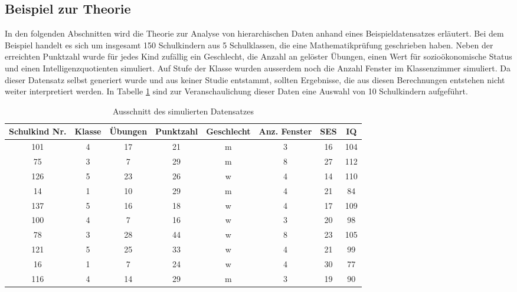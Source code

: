 \documentclass[12pt]{article}\usepackage[]{graphicx}\usepackage[]{color}
\begin{document}
\subsection{Beispiel zur Theorie} \label{section:bsp_theorie}
In den folgenden Abschnitten wird die Theorie zur Analyse von hierarchischen Daten anhand eines Beispieldatensatzes erläutert. Bei dem Beispiel handelt es sich um insgesamt 150 Schulkindern aus 5 Schulklassen, die eine Mathematikprüfung geschrieben haben. Neben der erreichten Punktzahl wurde für jedes Kind zufällig ein Geschlecht, die Anzahl an gelöster Übungen, einen Wert für sozioökonomische Status und einen Intelligenzquotienten simuliert. Auf Stufe der Klasse wurden ausserdem noch die Anzahl Fenster im Klassenzimmer simuliert. Da dieser Datensatz selbst generiert wurde und aus keiner Studie entstammt, sollten Ergebnisse, die aus diesen Berechnungen entstehen nicht weiter interpretiert werden. In Tabelle \ref{tab:beispiel_theorie} sind zur Veranschaulichung dieser Daten eine Auswahl von 10 Schulkindern aufgeführt.
\begin{table}[t!]
\centering
\begin{threeparttable}
\caption{Ausschnitt des simulierten Datensatzes} 
\begin{tabular}{cccccccc}
  \toprule
 Schulkind Nr. & Klasse & Übungen & Punktzahl & Geschlecht & Anz. Fenster & SES & IQ \\ 
  \midrule
101 & 4 & 17 & 21 & m & 3 & 16 & 104 \\ 
  75 & 3 & 7 & 29 & m & 8 & 27 & 112 \\ 
  126 & 5 & 23 & 26 & w & 4 & 14 & 110 \\ 
  14 & 1 & 10 & 29 & m & 4 & 21 & 84 \\ 
  137 & 5 & 16 & 18 & w & 4 & 17 & 109 \\ 
  100 & 4 & 7 & 16 & w & 3 & 20 & 98 \\ 
  78 & 3 & 28 & 44 & w & 8 & 23 & 105 \\ 
  121 & 5 & 25 & 33 & w & 4 & 21 & 99 \\ 
  16 & 1 & 7 & 24 & w & 4 & 30 & 77 \\ 
  116 & 4 & 14 & 29 & m & 3 & 19 & 90 \\ 
   \bottomrule
\end{tabular}
\label{tab:beispiel_theorie}
\end{threeparttable}
\end{table}
\end{document}
